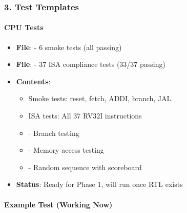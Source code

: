 \subsubsection{3. Test Templates}\label{cr:app:archive-cocotb-setup-summary:3-test-templates}

\paragraph{CPU Tests}\label{cr:app:archive-cocotb-setup-summary:cpu-tests}

\begin{record}

\begin{itemize}
\tightlist
\item
  \textbf{File}:  - 6 smoke tests (all
  passing)
\item
  \textbf{File}:  - 37 ISA
  compliance tests (33/37 passing)
\item
  \textbf{Contents}:

  \begin{itemize}
  \tightlist
  \item
    Smoke tests: reset, fetch, ADDI, branch, JAL
  \item
    ISA tests: All 37 RV32I instructions
  \item
     - Branch testing
  \item
     - Memory access testing
  \item
     - Random sequence with scoreboard
  \end{itemize}
\item
  \textbf{Status}: Ready for Phase 1, will run once RTL exists
\end{itemize}

\end{record}

\paragraph{Example Test (Working Now)}\label{cr:app:archive-cocotb-setup-summary:example-test-working-now}

